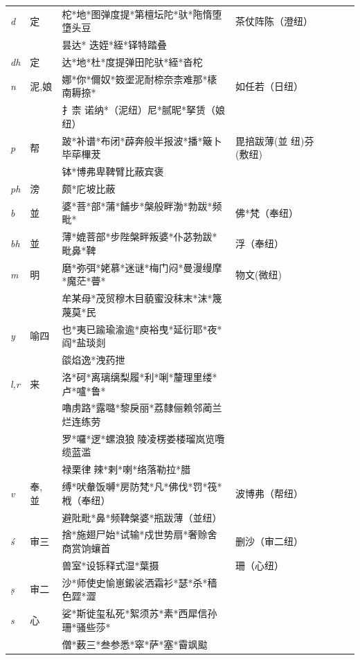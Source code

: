 \documentclass[oneside,a4paper,11pt]{article}
\newcommand{\ipa}[1]{{\phon\textit{#1}}}
\newcommand{\zh}[1]{{\cn #1}}
\begin{document}
\begin{table}[h]
{\begin{tabular}{lllllll}
\ipa{d} &	\zh{定} &	\zh{柁*地*图弹度提*第檀坛陀*驮*陁惰堕墯头豆} &	\zh{茶仗阵陈（澄纽）} \\
&&\zh{昙达* 迭姪*絰*铎特踏叠} \\
\ipa{dh} &	\zh{定} &	\zh{达*地*杜*度提弹田陀驮*絰*沓柁} &	\zh{} \\
\ipa{n} &	\zh{泥,娘} &	\zh{娜*你*儞奴*笯埿泥耐㮈奈柰难那*橠南耨捺*} &	\zh{如任若（日纽）} \\
&&\zh{扌柰 诺纳*（泥纽）尼*腻昵*拏赁（娘纽）} \\
\midrule
\ipa{p} &	\zh{帮} &	\zh{跛*补谱*布闭*薜奔般半报波*播*簸卜毕荜㮿茇} &	\zh{毘掊跋薄(並 纽)芬(敷纽)} \\
&&\zh{钵*博弗卑鞞臂比蔽宾褒} \\
\ipa{ph} &	\zh{滂} &	\zh{颇*庀坡比蔽} & \\
\ipa{b} &	\zh{並} &	\zh{婆*菩*部*蒲*餔步*槃般畔渤*勃跋*频毗*} &	\zh{佛*梵（奉纽）} \\
\ipa{bh} &	\zh{並} &	\zh{薄*媲菩部*步陛槃畔叛婆*仆苾勃跋*毗鼻*鞞} &	\zh{浮（奉纽）} \\
\ipa{m} &	\zh{明} &	\zh{磨*弥弭*姥慕*迷谜*梅门闷*曼漫缦摩*魔茫*瞢*} &	\zh{物文(微纽)} \\
&&\zh{牟某母*茂贸穆木目藐蜜没秣末*沫*篾蔑莫*民} \\
\midrule
\ipa{y} &	\zh{喻四} &	\zh{也*夷已踰瑜渝逾*庾裕曳*延衍耶*夜*阎*盐琰剡} & \\
&&\zh{燄焰逸*洩药抴} \\
\ipa{l,r} &	\zh{来} &	\zh{洛*砢*离璃缡梨履*利*唎*釐理里缕*卢*嚧*鲁*} & \\
&&\zh{嚕虏路*露𡀔*黎戾丽*荔隸俪赖邻蔺兰烂连练劳} \\
&&\zh{罗*囉*逻*螺浪狼𩜁陵凌楞娄楼瑠岚览囕缆蓝滥} \\
&&\zh{禄栗律𢫫辣*剌*喇*络落勒拉*腊} \\
\ipa{v} &	\zh{奉, 並} &	\zh{缚*吠軬饭嚩*房防梵*凡*佛伐*罚*筏*栰（奉纽）} &\zh{波博弗（帮纽）} \\
&&\zh{避阰毗*鼻*频鞞槃婆*瓶跋薄（並纽）} \\
\midrule
\ipa{ś} &	\zh{审三} &	\zh{捨*施翅尸始*试输*戍世势扇*奢赊舍商赏饷蠰首} &	\zh{删沙（审二纽） } \\
&&\zh{兽室*设铄释式湿*葉摄} & \zh{珊（心纽）} \\
\ipa{ṣ} &	\zh{审二} &	\zh{沙*师使史愉崽鎩裟洒霜衫*瑟*杀*穑色歰*澀} & \\
\ipa{s} &	\zh{心} &	\zh{娑*斯徙玺私死*絮须苏*素*西犀信孙珊*骚些莎* } & \\
&&\zh{僧*薮三*叁参悉*窣*萨*塞*霫飒䬃} \\

\end{tabular}}
\end{table}
\end{document}
